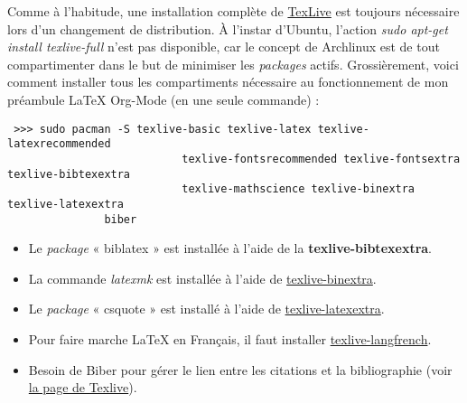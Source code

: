 \documentclass[10pt]{article}
\numberwithin{equation}{section}
\begin{document}
Comme à l'habitude, une installation complète de \href{https://wiki.archlinux.org/title/TeX\_Live}{TexLive} est toujours nécessaire lors d'un changement de distribution.
À l'instar d'Ubuntu, l'action \emph{sudo apt-get install texlive-full} n'est pas disponible, car le concept de Archlinux est de tout compartimenter dans le but de minimiser les \emph{packages} actifs. 
Grossièrement, voici comment installer tous les compartiments nécessaire au fonctionnement de mon préambule \LaTeX{} Org-Mode (en une seule commande) : 
\begin{verbatim}
 >>> sudo pacman -S texlive-basic texlive-latex texlive-latexrecommended
                           texlive-fontsrecommended texlive-fontsextra texlive-bibtexextra
                           texlive-mathscience texlive-binextra texlive-latexextra
			   biber
\end{verbatim}
\begin{itemize}
\item Le \emph{package} « biblatex » est installée à l'aide de la \textbf{texlive-bibtexextra}.
\item La commande \emph{latexmk} est installée à l'aide de \href{https://bbs.archlinux.org/viewtopic.php?id=286621}{texlive-binextra}.
\item Le \emph{package} « csquote » est installé à l'aide de \href{https://bbs.archlinux.org/viewtopic.php?id=63529}{texlive-latexextra}.
\item Pour faire marche \LaTeX{} en Français, il faut installer \href{https://archlinux.org/packages/extra/any/texlive-langfrench/}{texlive-langfrench}.
\item Besoin de Biber pour gérer le lien entre les citations et la bibliographie (voir \href{https://wiki.archlinux.org/title/TeX\_Live}{la page de Texlive}).
\end{itemize}


\printbibliography
\end{document}

